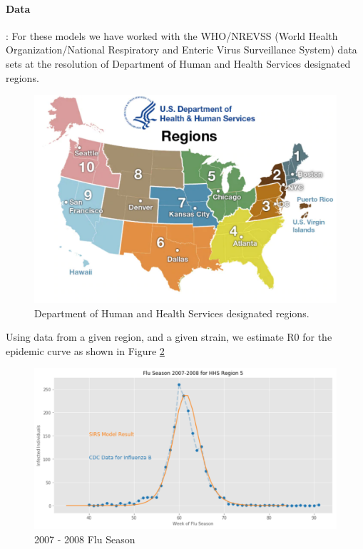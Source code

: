 \documentclass[11pt]{article}
\begin{document}
\paragraph{Data}: For these models we have worked with the WHO/NREVSS (World Health Organization/National Respiratory and Enteric Virus Surveillance System) data sets at the resolution of Department of Human and Health Services designated regions.

\begin{figure}
\includegraphics[width=\textwidth]{figs/regionsmap.pdf}
\caption{Department of Human and Health Services designated regions.}
\label{Fig:Regions}
\end{figure}

Using data from a given region, and a given strain, we estimate R0 for the epidemic curve as shown in Figure \ref{Fig:R0}

\begin{figure}
\includegraphics[width=\textwidth]{figs/2007-2008-SIRS.pdf}
\caption{2007 - 2008 Flu Season}
\label{Fig:R0}
\end{figure}
\end{document}
